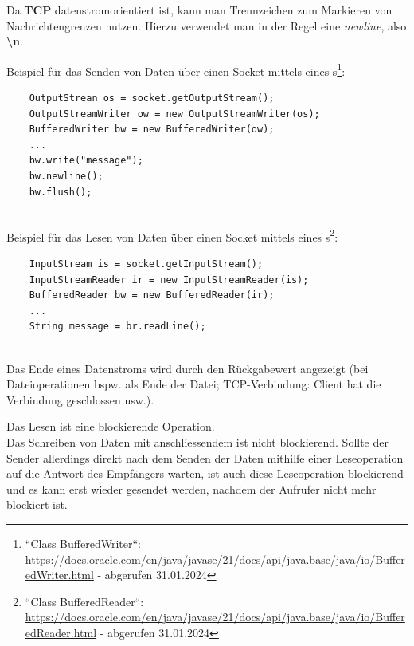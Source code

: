 \noindent
Da \textbf{TCP} datenstromorientiert ist, kann man Trennzeichen zum Markieren von Nachrichtengrenzen nutzen.
Hierzu verwendet man in der Regel eine \textit{newline}, also \textbf{\textbackslash n}.

Beispiel für das Senden von Daten über einen Socket mittels eines s\footnote{
    ``Class BufferedWriter``: \url{https://docs.oracle.com/en/java/javase/21/docs/api/java.base/java/io/BufferedWriter.html} - abgerufen 31.01.2024
}:
\begin{verbatim}
    OutputStrean os = socket.getOutputStream();
    OutputStreamWriter ow = new OutputStreamWriter(os);
    BufferedWriter bw = new BufferedWriter(ow);
    ...
    bw.write("message");
    bw.newline();
    bw.flush();
\end{verbatim}\\

Beispiel für das Lesen von Daten über einen Socket mittels eines s\footnote{
    ``Class BufferedReader``: \url{https://docs.oracle.com/en/java/javase/21/docs/api/java.base/java/io/BufferedReader.html} - abgerufen 31.01.2024
}:
\begin{verbatim}
    InputStream is = socket.getInputStream();
    InputStreamReader ir = new InputStreamReader(is);
    BufferedReader bw = new BufferedReader(ir);
    ...
    String message = br.readLine();
\end{verbatim}\\

\noindent
Das Ende eines Datenstroms wird durch den Rückgabewert  angezeigt (bei Dateioperationen {bspw.} als Ende der Datei; TCP-Verbindung: Client hat die Verbindung geschlossen usw.).\\

\begin{tcolorbox}
    Das Lesen ist eine blockierende Operation.\\
    Das Schreiben von Daten mit anschliessendem  ist nicht blockierend.
    Sollte der Sender allerdings direkt nach dem Senden der Daten mithilfe einer Leseoperation auf die Antwort des Empfängers warten, ist auch diese Leseoperation blockierend und es kann erst wieder gesendet werden, nachdem der Aufrufer nicht mehr blockiert ist.
\end{tcolorbox}

